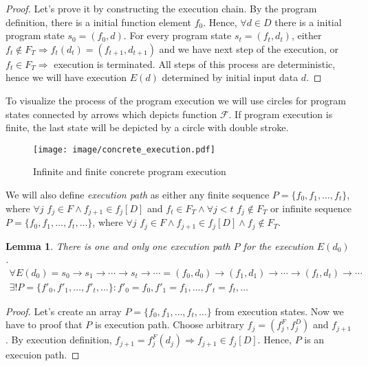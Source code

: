 \documentclass[fleqn,oneside,a4]{article}
\newcommand{\Ra}{\Rightarrow}
\newcommand{\ra}{\rightarrow}
\newcommand{\term}[1]{\textit{#1}\index{#1}}
\newtheorem{lemma}[theorem]{Lemma}
\begin{document}
\begin{proof}
    Let's prove it by constructing the execution chain.
    By the program definition, there is a initial function element $f_0$.
    Hence, $\forall d \in D$
    there is a initial program state $s_0 = (f_0, d)$.
    For every program state $s_t = (f_t, d_t)$,
    either $f_t \notin F_T \Ra f_t(d_t) = (f_{t + 1}, d_{t + 1})$
        and we have next step of the execution,
    or $f_t \in F_T \Ra$ execution is terminated.
    All steps of this process are deterministic,
    hence we will have execution $E(d)$ determined by initial input data $d$.
\end{proof}

To visualize the process of the program execution we will use circles
for program states connected by arrows which depicts function $\mathcal{F}$.
If program execution is finite, the last state will be depicted by
a circle with double stroke.

\begin{figure}[h!]
    \begin{center}
        \texttt{[image: image/concrete\_execution.pdf]}
    \end{center}
    \caption{Infinite and finite concrete program execution}
\end{figure}

We will also define \term{execution path} as either any finite sequence
$P = \{f_0, f_1, \dots, f_t\}$, where
$\forall j \,\, f_j \in F \land f_{j + 1} \in f_j[D]$
and $f_t \in F_T \land \forall j < t \,\, f_j \notin F_T$
or infinite sequence $P = \{f_0, f_1, \dots, f_t, \dots\}$, where
$\forall j \,\, f_j \in F \land f_{j + 1} \in f_j[D] \land f_j \notin F_T$.

\begin{lemma}
    There is one and only one execution path $P$ for the execution $E(d_0)$.
    \[ \begin{array}{c}
    \forall E(d_0) = s_0 \ra s_1 \ra \cdots \ra s_t \ra \cdots =
        (f_0, d_0) \ra (f_1, d_1) \ra \cdots \ra (f_t, d_t) \ra \cdots \\
    \exists! P = \{f'_0, f'_1, \dots, f'_t, \dots\}:
        f'_0 = f_0, f'_1 = f_1, \dots, f'_t = f_t, \dots
    \end{array} \]
\end{lemma}

\begin{proof}
    Let's create an array $P = \{f_0, f_1, \dots, f_t, \dots\}$ from
    execution states.
    Now we have to proof that $P$ is execution path.
    Choose arbitrary $f_j = (f_j^F, f_j^D)$ and $f_{j + 1}$.
    By execution definition,
    $f_{j + 1} = f_j^F(d_j) \Ra f_{j + 1} \in f_j[D]$.
    Hence, $P$ is an execuion path.
\end{proof}
\end{document}
